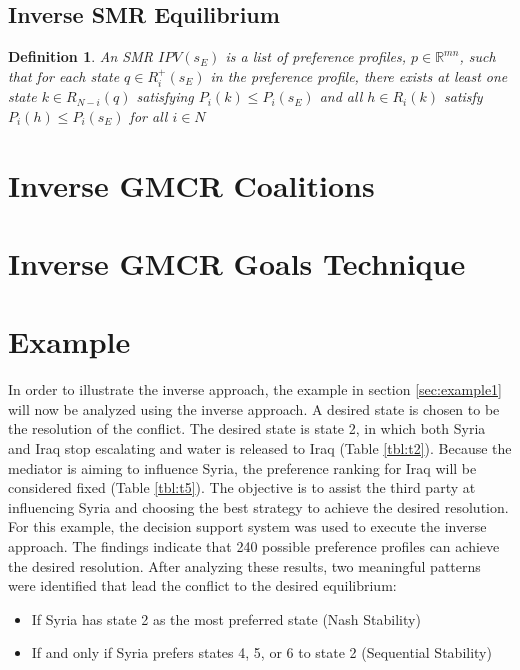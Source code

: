 \documentclass[letterpaper,12pt,titlepage,oneside,final]{book}
\newtheorem{definition}[lemma]{Definition}
\begin{document}
\subsection{Inverse SMR Equilibrium}

\begin{definition}
\label{def:smr_inv}
\rm
An \emph{SMR $IPV(s_E)$} is a list of preference profiles, $p \in \mathbb{R}^{mn}$, such that for each state $q \in R^{+}_{i}(s_E)$ in the preference profile, there exists at least one state $k\in R_{N-i}(q)$ satisfying $P_i(k)\leq P_i(s_E)$ and all $h \in R_{i}(k)$ satisfy $P_i(h)\leq P_i(s_E)$ for all %
$i \in N$ 
\end{definition}



\section{Inverse GMCR Coalitions}

\section{Inverse GMCR Goals Technique}

\section{Example}

In order to illustrate the inverse approach, the example in section \ref{sec:example1} will now be analyzed using the inverse approach. A desired state is chosen to be the resolution of the conflict. The desired state is state 2, in which both Syria and Iraq stop escalating and water is released to Iraq (Table \ref{tbl:t2}). Because the mediator is aiming to influence Syria, the preference ranking for Iraq will be considered fixed (Table \ref{tbl:t5}). The objective is to assist the third party at influencing Syria and choosing the best strategy to achieve the desired resolution. For this example, the decision support system was used to execute the inverse approach. The findings indicate that 240 possible preference profiles can achieve the desired resolution. After analyzing these results, two meaningful patterns were identified that lead the conflict to the desired equilibrium:
\begin{itemize}
\item If Syria has state 2 as the most preferred state (Nash Stability)
\item If and only if Syria prefers states 4, 5, or 6 to state 2 (Sequential Stability)
\end{itemize}
\end{document}
